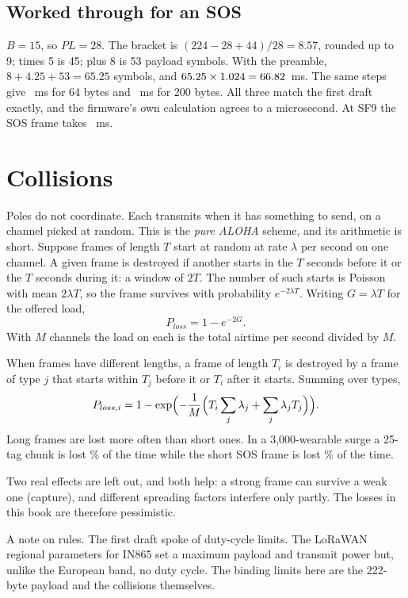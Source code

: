 \documentclass[11pt,a4paper,twoside,openany]{book}
\begin{document}
\subsection*{Worked through for an SOS}
$B=15$, so $PL=28$. The bracket is $(224-28+44)/28=8.57$, rounded up to 9; times 5 is 45; plus 8 is 53 payload
symbols. With the preamble, $8+4.25+53=65.25$ symbols, and $65.25\times1.024=66.82$~ms. The same steps give
\ToaBloom~ms for 64 bytes and \ToaChunk~ms for 200 bytes. All three match the first draft exactly, and the firmware's
own calculation agrees to a microsecond. At SF9 the SOS frame takes \ToaSosNine~ms.

\section{Collisions}
Poles do not coordinate. Each transmits when it has something to send, on a channel picked at random. This is the
\emph{pure ALOHA} scheme, and its arithmetic is short. Suppose frames of length $T$ start at random at rate $\lambda$
per second on one channel. A given frame is destroyed if another starts in the $T$ seconds before it or the $T$ seconds
during it: a window of $2T$. The number of such starts is Poisson with mean $2\lambda T$, so the frame survives with
probability $e^{-2\lambda T}$. Writing $G=\lambda T$ for the offered load,
\begin{equation}P_{loss}=1-e^{-2G}.\end{equation}
With $M$ channels the load on each is the total airtime per second divided by $M$.

When frames have different lengths, a frame of length $T_i$ is destroyed by a frame of type $j$ that starts within
$T_j$ before it or $T_i$ after it starts. Summing over types,
\begin{equation}P_{loss,i}=1-\exp\Bigl(-\frac{1}{M}\Bigl(T_i\sum_j\lambda_j+\sum_j\lambda_jT_j\Bigr)\Bigr).\end{equation}
Long frames are lost more often than short ones. In a 3,000-wearable surge a 25-tag chunk is lost \LossChunk\% of
the time while the short SOS frame is lost \SosFirstLoss\% of the time.

Two real effects are left out, and both help: a strong frame can survive a weak one (capture), and different
spreading factors interfere only partly. The losses in this book are therefore pessimistic.

A note on rules. The first draft spoke of duty-cycle limits. The LoRaWAN regional parameters for IN865 set a maximum
payload and transmit power but, unlike the European band, no duty cycle. The binding limits here are the 222-byte
payload and the collisions themselves.
\end{document}
